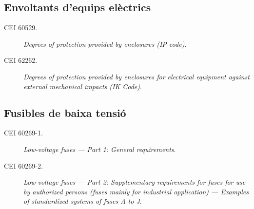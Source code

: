 \subsection*{Envoltants d'equips elèctrics}
\begin{description}
	\item [\hspace{5mm}CEI 60529.] \textit{Degrees of protection provided by enclosures (IP code)}.
	\item [\hspace{5mm}CEI 62262.] \textit{Degrees of protection provided by enclosures for electrical equipment against external mechanical impacts (IK Code)}.
\end{description}

\subsection*{Fusibles de baixa tensió}
\begin{description}
    \item [\hspace{5mm}CEI 60269-1.] \textit{Low-voltage fuses --- Part 1: General requirements}.
    \item [\hspace{5mm}CEI 60269-2.] \textit{Low-voltage fuses --- Part 2: Supplementary requirements for fuses for use by authorized persons
          (fuses mainly for industrial application) ---  Examples of standardized systems of fuses A to J}.
\end{description}


